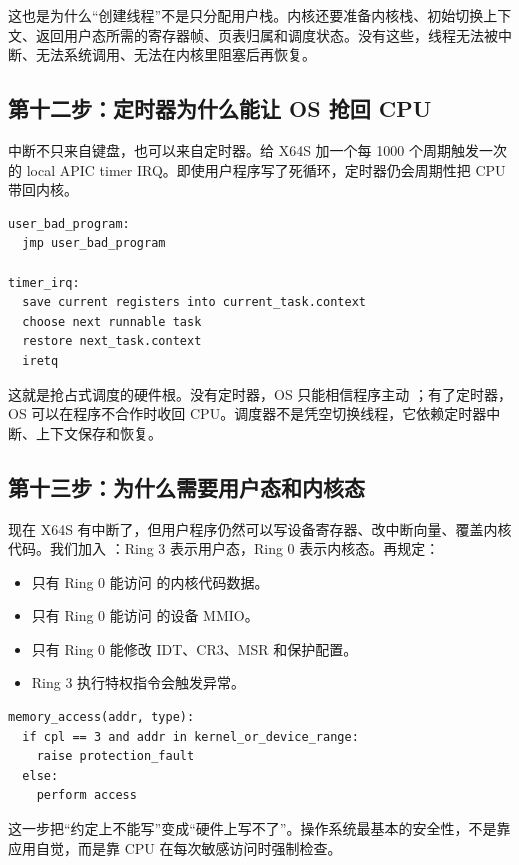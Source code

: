 这也是为什么“创建线程”不是只分配用户栈。内核还要准备内核栈、初始切换上下文、返回用户态所需的寄存器帧、页表归属和调度状态。没有这些，线程无法被中断、无法系统调用、无法在内核里阻塞后再恢复。

\subsection{第十二步：定时器为什么能让 OS 抢回 CPU}

中断不只来自键盘，也可以来自定时器。给 X64S 加一个每 1000 个周期触发一次的 local APIC timer IRQ。即使用户程序写了死循环，定时器仍会周期性把 CPU 带回内核。

\begin{lstlisting}
user_bad_program:
  jmp user_bad_program

timer_irq:
  save current registers into current_task.context
  choose next runnable task
  restore next_task.context
  iretq
\end{lstlisting}

这就是抢占式调度的硬件根。没有定时器，OS 只能相信程序主动 ；有了定时器，OS 可以在程序不合作时收回 CPU。调度器不是凭空切换线程，它依赖定时器中断、上下文保存和恢复。

\subsection{第十三步：为什么需要用户态和内核态}

现在 X64S 有中断了，但用户程序仍然可以写设备寄存器、改中断向量、覆盖内核代码。我们加入 ：Ring 3 表示用户态，Ring 0 表示内核态。再规定：

\begin{itemize}
\tightlist
\item 只有 Ring 0 能访问  的内核代码数据。
\item 只有 Ring 0 能访问  的设备 MMIO。
\item 只有 Ring 0 能修改 IDT、CR3、MSR 和保护配置。
\item Ring 3 执行特权指令会触发异常。
\end{itemize}

\begin{lstlisting}
memory_access(addr, type):
  if cpl == 3 and addr in kernel_or_device_range:
    raise protection_fault
  else:
    perform access
\end{lstlisting}

这一步把“约定上不能写”变成“硬件上写不了”。操作系统最基本的安全性，不是靠应用自觉，而是靠 CPU 在每次敏感访问时强制检查。

